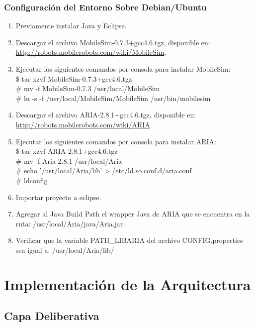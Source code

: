 \documentclass[11pt,twoside,A5]{article}
\newcommand{\sourcecode}[2][\footnotesize]{{\ttfamily#1#2}}
\newcommand{\link}[1]{{\footnotesize\url{#1}}}
\begin{document}
\subsubsection*{Configuración del Entorno Sobre Debian/Ubuntu}

\begin{enumerate}
\item Previamente instalar Java y Eclipse. 
\item Descargar el archivo \sourcecode{MobileSim-0.7.3+gcc4.6.tgz}, disponible en: \\ \link{http://robots.mobilerobots.com/wiki/MobileSim}.
\item Ejecutar los siguientes comandos por consola para instalar MobileSim:
\sourcecode{ 
\\ \$ tar xzvf MobileSim-0.7.3+gcc4.6.tgz
\\ \# mv -f MobileSim-0.7.3 /usr/local/MobileSim
\\ \# ln -s -f /usr/local/MobileSim/MobileSim /usr/bin/mobilesim}
\item Descargar el archivo \sourcecode{ARIA-2.8.1+gcc4.6.tgz}, disponible en: \\ \link{http://robots.mobilerobots.com/wiki/ARIA}.
\item Ejecutar los siguientes comandos por consola para instalar ARIA:
\sourcecode{
\\ \$ tar xzvf ARIA-2.8.1+gcc4.6.tgz
\\ \# mv -f Aria-2.8.1 /usr/local/Aria
\\ \# echo '/usr/local/Aria/lib' > /etc/ld.so.conf.d/aria.conf
\\ \# ldconfig}
\item Importar proyecto a eclipse.
\item Agregar al \sourcecode{Java Build Path} el wrapper Java de ARIA que se encuentra en la ruta: \sourcecode{/usr/local/Aria/java/Aria.jar}
\item Verificar que la variable \sourcecode{PATH\_LIBARIA} del archivo \sourcecode{CONFIG.properties} 
	  sea igual a: \sourcecode{/usr/local/Aria/lib/}
\end{enumerate}

\section*{Implementación de la Arquitectura}

\subsection*{Capa Deliberativa}
\end{document}
